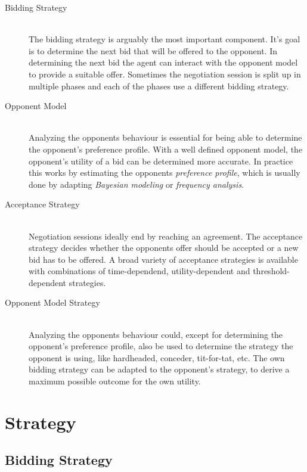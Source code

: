 \documentclass[a4paper,10pt]{article}
\begin{document}
\begin{description}
  \item[Bidding Strategy] \hfill \\
  The bidding strategy is arguably the most important component. It's goal is to determine the next bid that will be offered to the opponent. In determining the next bid the agent can interact with the opponent model to provide a suitable offer. Sometimes the negotiation session is split up in multiple phases and each of the phases use a different bidding strategy.

  \item[Opponent Model] \hfill \\
  Analyzing the opponents behaviour is essential for being able to determine the opponent's preference profile.  With a well defined opponent model, the opponent's utility of a bid can be determined more accurate. In practice this works by estimating the opponents \emph{preference profile}, which is usually done by adapting \emph{Bayesian modeling} or \emph{frequency analysis}. 

  \item[Acceptance Strategy] \hfill \\
  Negotiation sessions ideally end by reaching an agreement. The acceptance strategy decides whether the opponents offer should be accepted or a new bid has to be offered. A broad variety of acceptance strategies is available with combinations of time-dependend, utility-dependent and threshold-dependent strategies.

\item[Opponent Model Strategy] \hfill \\
  Analyzing the opponents behaviour could, except for determining the opponent's preference profile, also be used to determine the strategy the opponent is using, like hardheaded, conceder, tit-for-tat, etc. The own bidding strategy can be adapted to the opponent's strategy, to derive a maximum possible outcome for the own utility.

\end{description}

\section{Strategy}
\label{sec:strategy}

\subsection{Bidding Strategy}
\label{sec:strategyBS}

\end{document}

